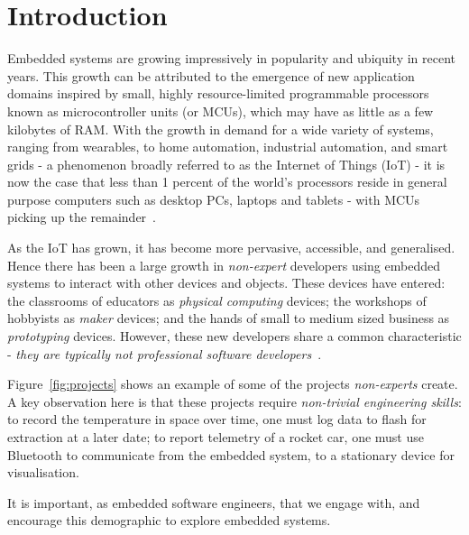 
\section{Introduction}
\label{sec:intro}

Embedded systems are growing impressively in popularity and ubiquity in recent years. This growth can be attributed to the emergence of new application domains inspired by small, highly resource-limited programmable processors known as microcontroller units (or MCUs), which may have as little as a few kilobytes of RAM. With the growth in demand for a wide variety of systems, ranging from wearables, to home automation, industrial automation, and smart grids - a phenomenon broadly referred to as the Internet of Things (IoT) - it is now the case that less than 1 percent of the world's processors reside in general purpose computers such as desktop PCs, laptops and tablets - with MCUs picking up the remainder~\cite{borriello2000embedded}.

As the IoT has grown, it has become more pervasive, accessible, and generalised. Hence there has been a large growth in \emph{non-expert} developers using embedded systems to interact with other devices and objects. These devices have entered: the classrooms of educators as \emph{physical computing} devices; the workshops of hobbyists as \emph{maker} devices; and the hands of small to medium sized business as \emph{prototyping} devices. However, these new developers share a common characteristic - \emph{they are typically not professional software developers}~\cite{dougherty2012maker,bruce2015make,maksimovic2014raspberry}.

Figure~\ref{fig:projects} shows an example of some of the projects \emph{non-experts} create. A key observation here is that these projects require \emph{non-trivial engineering skills}: to record the temperature in space over time, one must log data to flash for extraction at a later date; to report telemetry of a rocket car, one must use Bluetooth to communicate from the embedded system, to a stationary device for visualisation.

It is important, as embedded software engineers, that we engage with, and encourage this demographic to explore embedded systems.

